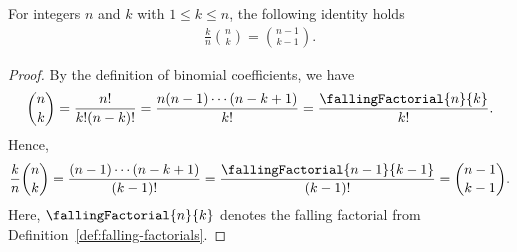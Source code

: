 \begin{lemma}
  \label{lem:binomial-extraction}
  For integers $n$ and $k$ with $1 \leq k \leq n$, the following identity holds
  \begin{align*}
    \frac{k}{n} \binom{n}{k} = \binom{n-1}{k-1}.
  \end{align*}
  \begin{proof}
    By the definition of binomial coefficients, we have
    \begin{align*}
      \binom{n}{k}
      = \frac{n!}{k!(n-k)!}
      = \frac{n(n-1)\cdots(n-k+1)}{k!}
      = \frac{\fallingFactorial{n}{k}}{k!}.
    \end{align*}
    Hence,
    \begin{align*}
      \frac{k}{n} \binom{n}{k}
      = \frac{(n-1)\cdots(n-k+1)}{(k-1)!}
      = \frac{\fallingFactorial{n-1}{k-1}}{(k-1)!}
      = \binom{n-1}{k-1}.
    \end{align*}
    Here, $\fallingFactorial{n}{k}$ denotes the falling factorial from Definition~\ref{def:falling-factorials}.
  \end{proof}
\end{lemma}
